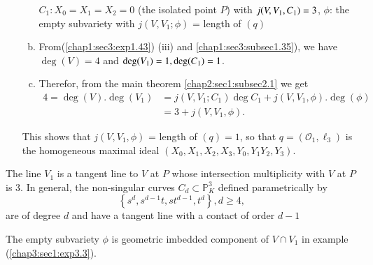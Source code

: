 \begin{enumerate}[(i)]
\begin{enumerate}[(a)]
      $C_1:  X_0 = X_1 = X_2 =0$ (the isolated point $P$) with $j(V,
      V_1,C_1)\break = 3$, $\phi$: the empty subvariety with $ j(V, V_1 ; \phi )
      $ = length of $(q)$ 

    \item From\pageoriginale (\ref{chap1:sec3:exp1.43}) (iii) and
      \ref{chap1:sec3:subsec1.35}), we have $\deg
      (V) = 4$ and $\deg (V_1)\break = 1, \deg (C_1) = 1$. 
    \item Therefor, from the main theorem  \ref{chap2:sec1:subsec2.1} we get 
  \begin{align*}
    4 =\deg (V). \deg (V_1) &= j (V, V_1 ; C_1) \deg C_1 + j (V, V_1,
    \phi). \deg (\phi)\\ 
    &= 3 + j (V, V_1, \phi).
  \end{align*}
  \end{enumerate}
  This shows that $j(V, V_1, \phi)$ = length of $(q) = 1$, so that $q
  =( \mathscr{O}_1, \ell_3)$ is the homogeneous maximal ideal $(X_0,
  X_1, X_2, X_3, Y_0, Y_1 Y_2, Y_3)$. 
\end{enumerate}

The line $V_1$ is a tangent line to $V$ at $P$ whose intersection
multiplicity with $V$ at $P$ is $3$. In general, the non-singular
curves $C_d \subset \mathbb{P}^3_K$ defined parametrically by 
$$
\left\{ s^d, s^{d-1}t, st^{d-1}, t^d\right\}, d \geq 4, 
$$
are of degree $d$ and have a tangent line with a contact of order
$d-1$ 

\setcounter{remark}{3}
\begin{remark}\label{chap3:sec1:rem3.4}
  The empty subvariety $\phi$ is geometric imbedded component of $V \cap
  V_1$ in example (\ref{chap3:sec1:exp3.3}). 
\end{remark}

